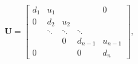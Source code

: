 \[\mathbf{U}=\begin{bmatrix}d_{1}&u_{1}&&&0\\
0&d_{2}&u_{2}&&\\
&\ddots&\ddots&\ddots&\\
&&0&d_{n-1}&u_{n-1}\\
0&&&0&d_{n}\end{bmatrix},\]